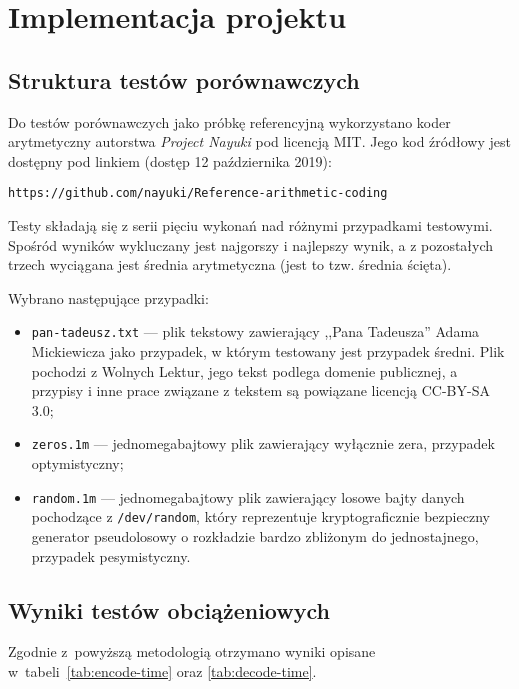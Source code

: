 \documentclass[../../thesis.tex]{subfiles}
\begin{document}
\chapter{Implementacja projektu}

\section{Struktura testów porównawczych}

Do testów porównawczych jako próbkę referencyjną
wykorzystano koder arytmetyczny autorstwa \emph{Project Nayuki}
pod licencją MIT. Jego kod źródłowy jest dostępny pod linkiem (dostęp
12 października 2019):

\begin{center}
\verb|https://github.com/nayuki/Reference-arithmetic-coding|
\end{center}

Testy składają się z serii pięciu wykonań nad różnymi przypadkami
testowymi. Spośród wyników wykluczany jest najgorszy i najlepszy
wynik, a z pozostałych trzech wyciągana jest średnia arytmetyczna
(jest to tzw. średnia ścięta).

Wybrano następujące przypadki:
\begin{itemize}
  \item \texttt{pan-tadeusz.txt} --- plik tekstowy zawierający
    ,,Pana Tadeusza'' Adama Mickiewicza jako przypadek, w którym
    testowany jest przypadek średni. Plik pochodzi z Wolnych Lektur,
    jego tekst podlega domenie publicznej, a przypisy i inne
    prace związane z tekstem są powiązane licencją CC-BY-SA 3.0;
  \item \texttt{zeros.1m} --- jednomegabajtowy plik zawierający
    wyłącznie zera, przypadek optymistyczny;
  \item \texttt{random.1m} --- jednomegabajtowy plik zawierający 
    losowe bajty danych pochodzące z \texttt{/dev/random}, który
    reprezentuje kryptograficznie bezpieczny generator pseudolosowy
    o rozkładzie bardzo zbliżonym do jednostajnego, przypadek
    pesymistyczny.
\end{itemize}

\section{Wyniki testów obciążeniowych}

Zgodnie z~powyższą metodologią otrzymano wyniki opisane 
w~tabeli~\ref{tab:encode-time} oraz \ref{tab:decode-time}.
\end{document}
